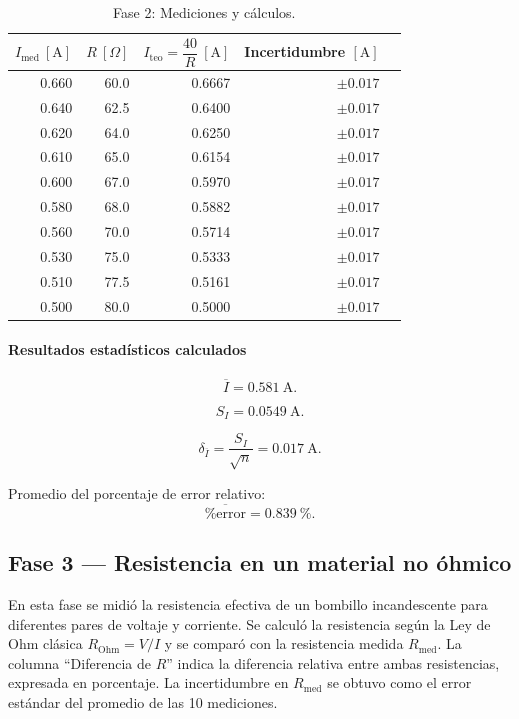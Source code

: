\documentclass[11pt,twocolumn]{article}
\begin{document}
\begin{table}[h]
\centering
\caption{Fase 2: Mediciones y cálculos.}

\label{tab:fase2}

\begin{tabular}{r r r r r}
\hline
$I_{\mathrm{med}}\ [\mathrm{A}]$ & $R\ [\Omega]$ & $I_{\mathrm{teo}}=\dfrac{40}{R}\ [\mathrm{A}]$ & Incertidumbre $[\mathrm{A}]$ \\
\hline
0.660 & 60.0   & 0.6667 & $\pm 0.017$ \\
0.640 & 62.5   & 0.6400 & $\pm 0.017$ \\
0.620 & 64.0   & 0.6250 & $\pm 0.017$ \\
0.610 & 65.0   & 0.6154 & $\pm 0.017$ \\
0.600 & 67.0   & 0.5970 & $\pm 0.017$ \\
0.580 & 68.0   & 0.5882 & $\pm 0.017$ \\
0.560 & 70.0   & 0.5714 & $\pm 0.017$ \\
0.530 & 75.0   & 0.5333 & $\pm 0.017$ \\
0.510 & 77.5   & 0.5161 & $\pm 0.017$ \\
0.500 & 80.0   & 0.5000 & $\pm 0.017$ \\
\hline
\end{tabular}
\end{table}

\paragraph{Resultados estadísticos calculados}

\[
\overline{I} = 0.581\ \mathrm{A}.
\]

\[
S_{I} = 0.0549\ \mathrm{A}.
\]

\[
\delta_{\overline{I}} = \frac{S_I}{\sqrt{n}} = 0.017\ \mathrm{A}.
\]

Promedio del porcentaje de error relativo:
\[
\overline{\%\mathrm{error}} = 0.839\ \%.
\]

\subsection*{Fase 3 — Resistencia en un material no óhmico}

En esta fase se midió la resistencia efectiva de un bombillo incandescente para diferentes pares de voltaje y corriente. 
Se calculó la resistencia según la Ley de Ohm clásica $R_{\mathrm{Ohm}} = V/I$ y se comparó con la resistencia medida 
$R_{\mathrm{med}}$. La columna ``Diferencia de $R$'' indica la diferencia relativa entre ambas resistencias, expresada en porcentaje. 
La incertidumbre en $R_{\mathrm{med}}$ se obtuvo como el error estándar del promedio de las 10 mediciones.
\end{document}
